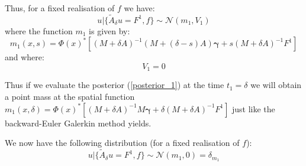 \documentclass{article}
\theoremstyle{definition}
\theoremstyle{remark}
\theoremstyle{remark}
\begin{document}
Thus, for a fixed realisation of $f$ we have:
\begin{equation}
    \label{posterior_1}
    u|\{\tilde{A}_{\delta}u=F^{1},f\}\sim\mathcal{N}(m_{1},V_{1})
\end{equation}
where the function $m_{1}$ is given by:
\begin{equation}
    m_{1}(x,s)=\Phi(x)^{*}[(M+\delta A)^{-1}(M+(\delta-s)A)\boldsymbol{\gamma}+s (M+\delta A)^{-1}F^{1}]
\end{equation}
and where:
\begin{equation*}
    V_{1}=0
\end{equation*}

Thus if we evaluate the posterior (\ref{posterior_1}) at the time $t_{1}=\delta$ we will obtain a point mass at the spatial function
$m_{1}(x,\delta)=\Phi(x)^{*}[(M+\delta A)^{-1}M\boldsymbol{\gamma}+\delta (M+\delta A)^{-1}F^{1}]$ just like the backward-Euler Galerkin method yields.

We now have the following distribution (for a fixed realisation of $f$):
\begin{equation}
    \label{dist_time_1_fixed_f}
    u|\{\tilde{A}_{\delta}u=F^{1},f\}\sim\mathcal{N}(m_1,0)=\delta_{m_{1}}
\end{equation}
\end{document}
